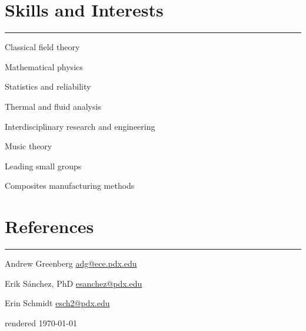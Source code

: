 \section{Skills and Interests}
\noindent\rule{\textwidth}{\hlinewidth}
\begin{multicols}{2}
	\begin{innerlist}
	\item Classical field theory
	\item Mathematical physics
	\item Statistics and reliability
	\item Thermal and fluid analysis
	\item Interdisciplinary research and engineering
	\item Music theory
	\item Leading small groups
	\item Composites manufacturing methods
	\end{innerlist}
\end{multicols}
\vfill
\section{References}
\noindent\rule{\textwidth}{\hlinewidth}
	\begin{innerlist}
	\item Andrew Greenberg \hfill\href{mailto:adg@ece.pdx.edu}{adg@ece.pdx.edu}
	\item Erik S\'anchez, PhD \hfill\href{mailto:esanchez@pdx.edu}{esanchez@pdx.edu}
	\item Erin Schmidt \hfill\href{mailto:esch2@pdx.edu}{esch2@pdx.edu}
	\end{innerlist}

\vfill
\centering rendered \today

